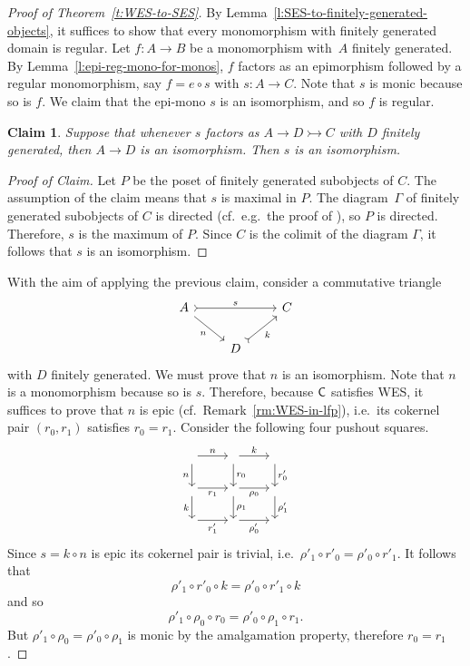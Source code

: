 \documentclass[a4paper,10pt,reqno]{amsart}
\newtheorem{claim}[theorem]{Claim}
\theoremstyle{definition}
\theoremstyle{remark}
\newcommand{\cat}{{\sf C}}								%
\newcommand{\emb}{\rightarrowtail}							%
\newcommand{\WES}{\textnormal{WES}}
\begin{document}
\begin{proof}[Proof of Theorem~\ref{t:WES-to-SES}]
By Lemma~\ref{l:SES-to-finitely-generated-objects}, it suffices to show that every monomorphism with finitely generated domain is regular.
%
Let $f\colon A\to B$ be a monomorphism with~$A$ finitely generated. By Lemma~\ref{l:epi-reg-mono-for-monos}, $f$ factors as an epimorphism followed by a regular monomorphism, say $f=e\circ s$ with $s\colon A \to C$. Note that $s$ is monic because so is $f$. We claim that the epi-mono $s$ is an isomorphism, and so $f$ is regular.


\begin{claim}
	Suppose that whenever $s$ factors as $A\to D\emb C$ with $D$ finitely generated, then $A\to D$ is an isomorphism. Then $s$ is an isomorphism.
	\end{claim}
	\begin{proof}[Proof of Claim]
	Let $P$ be the poset of finitely generated subobjects of $C$. The assumption of the claim means that $s$ is maximal in $P$. The diagram~$\Gamma$ of finitely generated subobjects of $C$ is directed (cf.\ e.g.\ the proof of \cite[Theorem~1.70]{ar94book}), so $P$ is directed. Therefore, $s$ is the maximum of $P$. Since $C$ is the colimit of the diagram $\Gamma$, it follows that $s$ is an isomorphism.
	\end{proof}
	With the aim of applying the previous claim, consider a commutative triangle
	\[\begin{tikzcd}
	A \arrow[rightarrowtail]{rr}{s} \arrow{dr}[swap]{n} & & C \\
	& D \arrow[rightarrowtail]{ur}[swap]{k} &
	\end{tikzcd}\]
	with $D$ finitely generated. We must prove that $n$ is an isomorphism. Note that $n$ is a monomorphism because so is $s$. Therefore, because $\cat$ satisfies \WES, it suffices to prove that $n$ is epic (cf.\ Remark~\ref{rm:WES-in-lfp}), i.e.\ its cokernel pair $(r_{0},r_{1})$ satisfies $r_{0}=r_{1}$.
	Consider the following four pushout squares.
	\[\begin{tikzcd}
	{} \arrow{r}{n} \arrow{d}[swap]{n} & {} \arrow{r}{k} \arrow{d}{r_{0}} & {} \arrow{d}{r'_{0}} \\
	{} \arrow{r}[swap]{r_{1}} \arrow{d}[swap]{k} & {} \arrow{r}[swap]{\rho_{0}} \arrow{d}{\rho_{1}}  & {} \arrow{d}{\rho'_{1}}  \\
	{} \arrow{r}[swap]{r'_{1}} & {} \arrow{r}[swap]{\rho'_{0}}  & {} 
	\end{tikzcd}\]
	Since $s=k\circ n$ is epic its cokernel pair is trivial, i.e.\ $\rho'_{1}\circ r'_{0} = \rho'_{0}\circ r'_{1}$. It follows that 
	\[
	\rho'_{1}\circ r'_{0}\circ k = \rho'_{0}\circ r'_{1}\circ k
	\]
	and so 
	\[ 
	\rho'_{1}\circ \rho_{0}\circ r_{0} = \rho'_{0}\circ \rho_{1}\circ r_{1}.
	\]
	But $\rho'_{1}\circ \rho_{0}=\rho'_{0}\circ \rho_{1}$ is monic by the amalgamation property, therefore $r_{0}=r_{1}$.
\end{proof}
\end{document}
